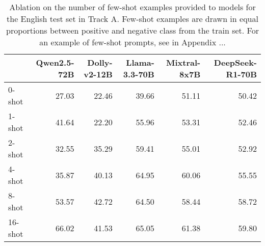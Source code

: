 \begin{table*}
\centering
\begin{tabular}{lrrrrr}
\toprule
 & Qwen2.5-72B & Dolly-v2-12B & Llama-3.3-70B & Mixtral-8x7B & DeepSeek-R1-70B \\
\midrule
0-shot & 27.03 & 22.46 & 39.66 & 51.11 & 50.42 \\
1-shot & 41.64 & 22.20 & 55.96 & 53.31 & 52.46 \\
2-shot & 32.55 & 35.29 & 59.41 & 55.01 & 52.92 \\
4-shot & 35.87 & 40.13 & 64.95 & 60.06 & 55.55 \\
8-shot & 53.57 & 42.72 & 64.50 & 58.44 & 58.72 \\
16-shot & 66.02 & 41.53 & 65.05 & 61.38 & 59.80 \\
\bottomrule
\end{tabular}
\caption{Ablation on the number of few-shot examples provided to models for the English test set in Track A. Few-shot examples are drawn in equal proportions between positive and negative class from the train set. For an example of few-shot prompts, see  in Appendix ...}
\label{tab:ablation-few-shot}
\end{table*}